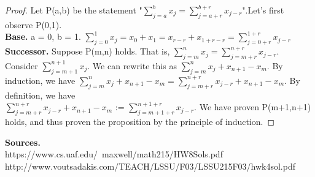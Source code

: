 \documentclass[12pt]{amsart}
\begin{document}
\begin{proof}
	Let P(a,b) be the statement "$\sum\limits_{j=a}^{b} x_j = \sum\limits_{j=a+r}^{b+r} x_{j-r}$".Let's first observe P(0,1).
	\\\textbf{Base.} a = 0, b = 1. $\sum\limits_{j=0}^{1} x_j = x_0 + x_1  = x_{r - r} + x_{1 + r - r} = \sum\limits_{j=0+r}^{1+r} x_{j-r}$
	\\\textbf{Successor.} Suppose P(m,n) holds. That is, $\sum\limits_{j=m}^{n} x_j = \sum\limits_{j=m+r}^{n+r} x_{j-r}$. Consider $\sum\limits_{j=m+1}^{n+1} x_j$. We can rewrite this as $\sum\limits_{j=m}^{n} x_j + x_{n+1} - x_{m}$. By induction, we have $\sum\limits_{j=m}^{n} x_j + x_{n+1} - x_{m} = \sum\limits_{j=m+r}^{n+r} x_{j-r} + x_{n+1} - x_{m}$.  By definition, we have\\ $\sum\limits_{j=m+r}^{n+r} x_{j-r} + x_{n+1} - x_{m}$ := $\sum\limits_{j=m+1+r}^{n+1+r} x_{j-r}$. We have proven P(m+1,n+1) holds, and thus proven the proposition by the principle of induction.
\end{proof}
\noindent\textbf{Sources.}
\\https://www.cs.uaf.edu/~maxwell/math215/HW8Sols.pdf
\\http://www.voutsadakis.com/TEACH/LSSU/F03/LSSU215F03/hwk4sol.pdf
\end{document}
